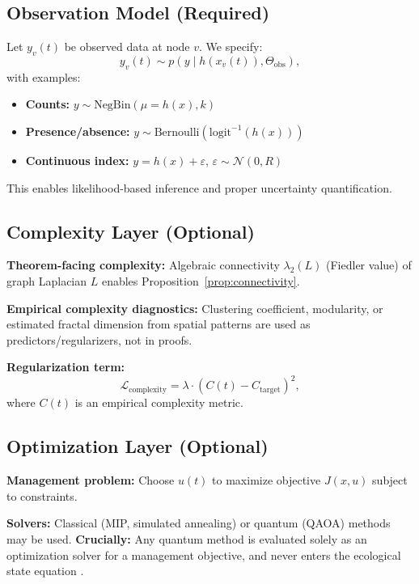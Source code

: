 \documentclass[12pt]{article}
\begin{document}
\subsection{Observation Model (Required)}
\label{subsec:observation}

Let $y_v(t)$ be observed data at node $v$. We specify:
\begin{equation}
\label{eq:obs}
y_v(t) \sim p(y \mid h(x_v(t)), \Theta_{\text{obs}}),
\end{equation}
with examples:
\begin{itemize}
    \item \textbf{Counts:} $y\sim \text{NegBin}(\mu=h(x), k)$
    \item \textbf{Presence/absence:} $y\sim \text{Bernoulli}(\text{logit}^{-1}(h(x)))$
    \item \textbf{Continuous index:} $y = h(x) + \varepsilon$, $\varepsilon\sim\mathcal{N}(0,R)$
\end{itemize}
This enables likelihood-based inference and proper uncertainty quantification.

\subsection{Complexity Layer (Optional)}
\label{subsec:complexity}

\textbf{Theorem-facing complexity:} Algebraic connectivity $\lambda_2(L)$ (Fiedler value) of graph Laplacian $L$ enables Proposition~\ref{prop:connectivity}.

\textbf{Empirical complexity diagnostics:} Clustering coefficient, modularity, or estimated fractal dimension from spatial patterns are used as predictors/regularizers, not in proofs.

\textbf{Regularization term:} 
\begin{equation}
\mathcal{L}_{\text{complexity}} = \lambda \cdot (C(t) - C_{\text{target}})^2,
\end{equation}
where $C(t)$ is an empirical complexity metric.

\subsection{Optimization Layer (Optional)}
\label{subsec:optimization}

\textbf{Management problem:} Choose $u(t)$ to maximize objective $J(x,u)$ subject to constraints.

\textbf{Solvers:} Classical (MIP, simulated annealing) or quantum (QAOA) methods may be used. \textbf{Crucially:} Any quantum method is evaluated solely as an optimization solver for a management objective, and never enters the ecological state equation \citep{Farhi2014}.
\end{document}
